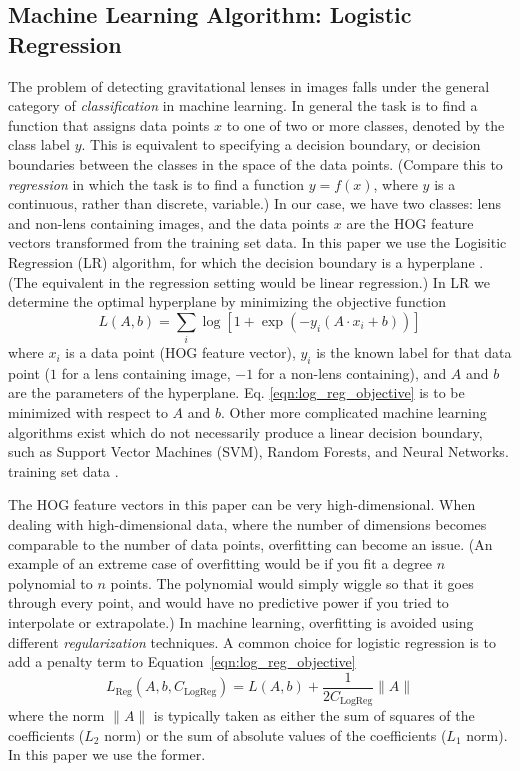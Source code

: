 \documentclass{emulateapj}
\begin{document}
\subsection{Machine Learning Algorithm: Logistic Regression}\label{sec:LR}
The problem of detecting gravitational lenses in images falls under
the general category of {\em{classification}} in machine learning. In
general the task is to find a function that assigns data points $x$ to
one of two or more classes, denoted by the class label $y$.  This is
equivalent to specifying a decision boundary, or decision boundaries
between the classes in the space of the data points.  (Compare this to
{\em{regression}} in which the task is to find a function $y=f(x)$,
where $y$ is a continuous, rather than discrete, variable.) In our
case, we have two classes: lens and non-lens containing images, and
the data points $x$ are the HOG feature vectors transformed from the
training set data.  In this paper we use the Logisitic Regression (LR)
algorithm, for which the decision boundary is a hyperplane .  (The
equivalent in the regression setting would be linear regression.) In
LR we determine the optimal hyperplane by minimizing the objective
function
\begin{equation}
\label{eqn:log_reg_objective}
L(A,b) = \sum_i \log \left[1 + \exp \left(-y_i (A \cdot x_i + b) \right) \right]
\end{equation}
where $x_i$ is a data point (HOG feature vector), $y_i$ is the
known label for that data point ($1$ for a lens containing
image, $-1$ for a non-lens containing), and $A$ and $b$ are
the parameters of the hyperplane. Eq. \ref{eqn:log_reg_objective}
is to be minimized with respect to $A$ and $b$.
Other more complicated machine learning algorithms exist which
do not necessarily produce a linear decision boundary, such as
Support Vector Machines (SVM), Random Forests, and Neural Networks.
training set data \citep{hastie_09}.

The HOG feature vectors in this paper can be very high-dimensional.
When dealing with high-dimensional data, where the number of
dimensions becomes comparable to the number of data points,
overfitting can become an issue. (An example of an extreme case
of overfitting would be if you fit a degree $n$ polynomial to $n$
points.  The polynomial would simply wiggle so that it goes
through every point, and would have no predictive power if you
tried to interpolate or extrapolate.) In machine learning,
overfitting is avoided using different {\em{regularization}}
techniques. A common choice for logistic regression is to
add a penalty term to Equation~\ref{eqn:log_reg_objective}
\begin{equation}\label{eqn:log_reg_regularized}
L_\text{Reg}(A,b,C_\text{LogReg}) = L(A,b) + \frac{1}{2C_\text{LogReg}} \|A\|
\end{equation}
where the norm $\|A\|$ is typically taken as either the
sum of squares of the coefficients ($L_2$ norm) or the sum
of absolute values of the coefficients ($L_1$ norm).  In this
paper we use the former.
\end{document}
